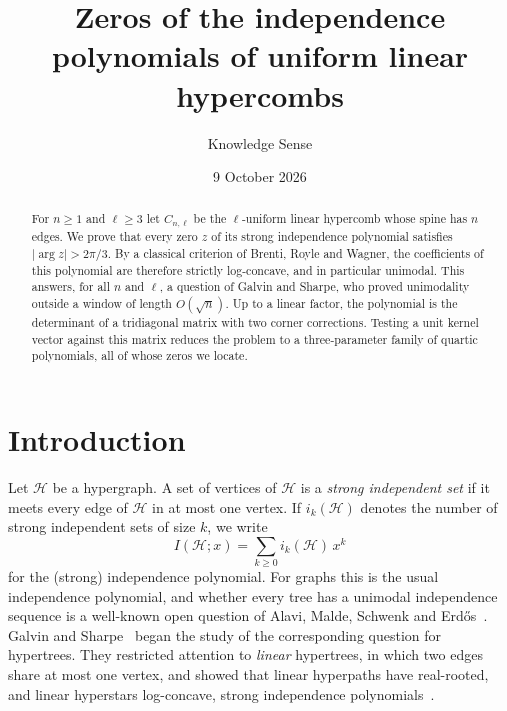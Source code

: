 \documentclass{amsart}
\theoremstyle{remark}
\numberwithin{equation}{section}
\begin{document}
\title{Zeros of the independence polynomials of uniform linear hypercombs}

\author{Knowledge Sense}
\address{Knowledge Sense}

\date{9 October 2026}



\begin{abstract}
For $n\ge 1$ and $\ell\ge 3$ let $C_{n,\ell}$ be the $\ell$-uniform linear
hypercomb whose spine has $n$ edges. We prove that every zero $z$ of its
strong independence polynomial satisfies $|\arg z|>2\pi/3$. By a classical
criterion of Brenti, Royle and Wagner, the coefficients of this polynomial
are therefore strictly log-concave, and in particular unimodal. This
answers, for all $n$ and $\ell$, a question of Galvin and Sharpe, who proved
unimodality outside a window of length $O(\sqrt{n})$. Up to a linear factor,
the polynomial is the determinant of a tridiagonal matrix with two corner
corrections. Testing a unit kernel vector against this matrix reduces the
problem to a three-parameter family of quartic polynomials, all of whose
zeros we locate.
\end{abstract}

\maketitle

\section{Introduction}

Let $\mathcal{H}$ be a hypergraph. A set of vertices of $\mathcal{H}$ is a
\emph{strong independent set} if it meets every edge of $\mathcal{H}$ in at
most one vertex. If $i_k(\mathcal{H})$ denotes the number of strong
independent sets of size $k$, we write
\[
I(\mathcal{H};x)=\sum_{k\ge 0} i_k(\mathcal{H})\,x^k
\]
for the (strong) independence polynomial. For graphs this is the usual
independence polynomial, and whether every tree has a unimodal independence
sequence is a well-known open question of Alavi, Malde, Schwenk and
Erd\H{o}s~\cite{AMSE}. Galvin and Sharpe~\cite{GS} began the study of the
corresponding question for hypertrees. They restricted attention to
\emph{linear} hypertrees, in which two edges share at most one vertex, and
showed that linear hyperpaths have real-rooted, and linear hyperstars
log-concave, strong independence polynomials~\cite[Theorem~1.3]{GS}.
\end{document}
